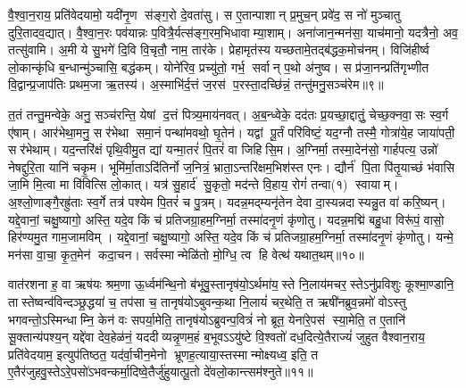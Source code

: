 वै॒श्वा॒न॒राय॒ प्रति॑वेदयामो॒ यदी॑नृ॒ण स॑ङ्ग॒रो दे॒वता॑सु। स ए॒तान्पाशान् प्र॒मुच॒न् प्रवे॑द॒ स नो॑ मुञ्चातु दुरि॒तादव॒द्यात्। वै॒श्वा॒न॒रः पव॑यान्नः प॒वित्रै॒र्यत्स॑ङ्ग॒रम॒भिधावाम्या॒शाम्। अना॑जान॒न्मन॑सा॒ याच॑मानो॒ यदत्रैनो॒ अव॒ तत्सु॑वामि। अ॒मी ये सु॒भगे॑ दि॒वि वि॒चृतौ॒ नाम॒ तार॑के। प्रेहामृत॑स्य यच्छतामे॒तद्ब॑द्धक॒मोच॑नम्। विजि॑हीर्ष्व लो॒कान्कृ॑धि ब॒न्धान्मु॑ञ्चासि॒ बद्ध॑कम्। योने॑रिव॒ प्रच्यु॑तो॒ गर्भ॒ सर्वान् प॒थो अ॑नुष्व। स प्र॑जा॒नन्प्रति॑गृभ्णीत वि॒द्वान्प्र॒जाप॑तिः प्रथम॒जा ऋ॒तस्य॑। अ॒स्माभि॑र्द॒त्तं ज॒रस॑ प॒रस्ता॒दच्छि॑न्नं॒ तन्तु॑मनु॒सञ्च॑रेम॥९॥

त॒तं तन्तु॒मन्वेके॒ अनु॒ सञ्च॑रन्ति॒ येषां द॒त्तं पित्र्य॒माय॑नवत्। अ॒ब॒न्ध्वेके॒ दद॑तः प्र॒यच्छा॒द्दातुं॒ चेच्छ॒क्नवा॒सः स्व॒र्ग ए॑षाम्। आर॑भेथा॒मनु॒ सर॑भेथा समा॒नं पन्था॑मवथो॒ घृ॒तेन॑। यद्वां पू॒र्तं परि॑विष्टं॒ यद॒ग्नौ तस्मै॒ गोत्रा॑ये॒ह जाया॑पती॒ सर॑भेथाम्। यद॒न्तरि॑क्षं पृथि॒वीमु॒त द्यां यन्मा॒तरं॑ पि॒तरं॑ वा जिहिसि॒म। अ॒ग्निर्मा॒ तस्मा॒देन॑सो॒ गार्\mbox{}हपत्य॒ उन्नो॑ नेषद्दुरि॒ता यानि॑ चकृ॒म। भूमि॑र्मा॒ताऽदि॑तिर्नो ज॒नित्रं॒ भ्राता॒ऽन्तरि॑क्षम॒भिश॑स्त एनः। द्यौर्न॑ पि॒ता पि॑तृ॒याच्छं भ॑वासि जा॒मि मि॒त्वा मा वि॑वित्सि लो॒कात्। यत्र॑ सु॒हार्द॑ सु॒कृतो॒ मद॑न्ते वि॒हाय॒ रोगं॑ तन्वा(१) स्वायाम्। अ॒श्लो॒णाङ्गै॒रह्रु॑ताः स्व॒र्गे तत्र॑ पश्येम पि॒तरं॑ च पु॒त्रम्। यदन्न॒मद्म्यनृ॑तेन देवा दा॒स्यन्नदास्यन्नु॒त वा॑ करि॒ष्यन्। यद्दे॒वानां॒ चक्षु॒ष्यागो॒ अस्ति॒ यदे॒व किं च॑ प्रतिजग्रा॒हम॒ग्निर्मा॒ तस्मा॑दनृ॒णं कृ॑णोतु। यदन्न॒मद्मि॑ बहु॒धा विरू॑पं॒ वासो॒ हिर॑ण्यमु॒त गाम॒जामविम्। यद्दे॒वानां॒ चक्षु॒ष्यागो॒ अस्ति॒ यदे॒व किं च॑ प्रतिजग्रा॒हम॒ग्निर्मा॒ तस्मा॑दनृ॒णं कृ॑णोतु। यन्मे॒ मन॑सा वा॒चा॒ कृ॒त॒मेन॑ कदा॒चन। सर्वस्मान्मेळि॑तो मो॒ग्धि॒ त्व हि वेत्थ॑ यथात॒थम्॥१०॥\anuvakamend

वात॑रशना ह॒ वा ऋष॑यः श्रम॒णा ऊ॒र्ध्वम॑न्थि॒नो ब॑भूवु॒स्तानृष॑यो॒\-ऽर्थमा॑य॒स्ते नि॒लाय॑मचर॒स्तेऽनु॑प्रविशुः कूश्मा॒ण्डानि॒ तास्तेष्वन्व॑विन्दञ्छ्र॒द्धया॑ च॒ तप॑सा च॒ तानृष॑योऽबुवन्क॒था नि॒लायं॑ चर॒थेति॒ त ऋषी॑नब्रुव॒न्नमो॑ वोऽस्तु भगवन्तो॒ऽस्मिन्धाम्नि॒ केन॑ वः सपर्या॒मेति॒ तानृष॑योऽब्रुवन्प॒वित्रं॑ नो ब्रूत॒ येना॑रे॒पस॑ स्या॒मेति॒ त ए॒तानि॑ सू॒क्तान्य॑पश्य॒न् यद्दे॑वा देव॒हेळ॑नं॒ यददीव्यन्नृ॒णम॒हं ब॒भूवऽऽयु॑ष्टे वि॒श्वतो॑ दध॒दित्ये॒तैराज्यं॑ जुहुत वैश्वान॒राय॒ प्रति॑वेदयाम॒ इत्युप॑तिष्ठत॒ यद॑र्वा॒चीन॒मेनो भ्रूणह॒त्याया॒स्तस्मान्मोक्ष्यध्व॒ इति॒ त ए॒तैर॑जुहवु॒स्तेऽरे॒पसो॑ऽभवन्कर्मा॒दिष्वे॒तैर्जु॑हुयात्पू॒तो दे॑वलो॒कान्त्सम॑श्नुते॥११॥\anuvakamend


